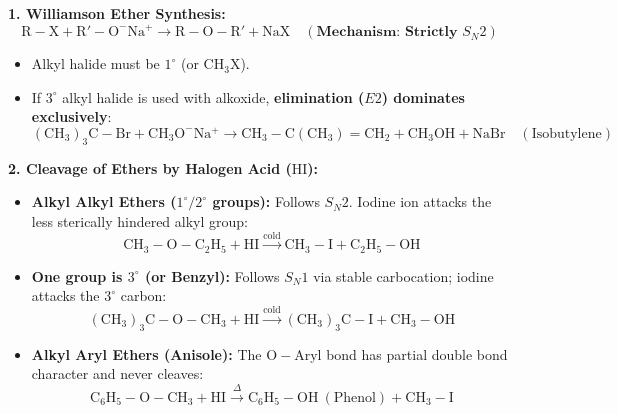 \documentclass[10pt,a4paper]{article}
\begin{document}
\begin{formulabox}
\textbf{1. Williamson Ether Synthesis:}
\begin{equation}
  \mathrm{R-X} + \mathrm{R'-O}^-\mathrm{Na}^+ \longrightarrow \mathrm{R-O-R'} + \mathrm{NaX} \quad (\textbf{Mechanism: Strictly } S_N2)
\end{equation}
\begin{itemize}
  \item Alkyl halide must be $1^\circ$ (or $\mathrm{CH_3X}$).
  \item If $3^\circ$ alkyl halide is used with alkoxide, \textbf{elimination ($E2$) dominates exclusively}:
  \begin{equation}
    (\mathrm{CH_3})_3\mathrm{C-Br} + \mathrm{CH_3O^-Na^+} \longrightarrow \mathrm{CH_3-C(CH_3)=CH_2} + \mathrm{CH_3OH} + \mathrm{NaBr} \quad (\text{Isobutylene})
  \end{equation}
\end{itemize}
\textbf{2. Cleavage of Ethers by Halogen Acid ($\mathrm{HI}$):}
\begin{itemize}
  \item \textbf{Alkyl Alkyl Ethers ($1^\circ / 2^\circ$ groups):} Follows $S_N2$. Iodine ion attacks the less sterically hindered alkyl group:
  \begin{equation}
    \mathrm{CH_3-O-C_2H_5} + \mathrm{HI} \xrightarrow{\text{cold}} \mathrm{CH_3-I} + \mathrm{C_2H_5-OH}
  \end{equation}
  \item \textbf{One group is $3^\circ$ (or Benzyl):} Follows $S_N1$ via stable carbocation; iodine attacks the $3^\circ$ carbon:
  \begin{equation}
    \mathrm{(CH_3)_3C-O-CH_3} + \mathrm{HI} \xrightarrow{\text{cold}} \mathrm{(CH_3)_3C-I} + \mathrm{CH_3-OH}
  \end{equation}
  \item \textbf{Alkyl Aryl Ethers (Anisole):} The $\mathrm{O-Aryl}$ bond has partial double bond character and never cleaves:
  \begin{equation}
    \mathrm{C_6H_5-O-CH_3} + \mathrm{HI} \xrightarrow{\Delta} \mathrm{C_6H_5-OH} \ (\text{Phenol}) + \mathrm{CH_3-I}
  \end{equation}
\end{itemize}
\end{formulabox}
\end{document}
